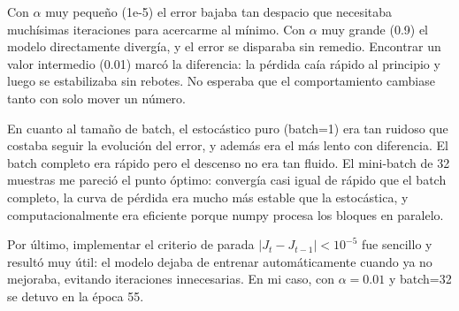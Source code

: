\documentclass[../../__memoria.tex]{subfiles}
\begin{document}
Con $\alpha$ muy pequeño (1e-5) el error bajaba tan despacio que necesitaba muchísimas iteraciones para acercarme al mínimo. Con $\alpha$ muy grande (0.9) el modelo directamente divergía, y el error se disparaba sin remedio. Encontrar un valor intermedio (0.01) marcó la diferencia: la pérdida caía rápido al principio y luego se estabilizaba sin rebotes. No esperaba que el comportamiento cambiase tanto con solo mover un número.

En cuanto al tamaño de batch, el estocástico puro (batch=1) era tan ruidoso que costaba seguir la evolución del error, y además era el más lento con diferencia. El batch completo era rápido pero el descenso no era tan fluido. El mini-batch de 32 muestras me pareció el punto óptimo: convergía casi igual de rápido que el batch completo, la curva de pérdida era mucho más estable que la estocástica, y computacionalmente era eficiente porque numpy procesa los bloques en paralelo.

Por último, implementar el criterio de parada $|J_t - J_{t-1}| < 10^{-5}$ fue sencillo y resultó muy útil: el modelo dejaba de entrenar automáticamente cuando ya no mejoraba, evitando iteraciones innecesarias. En mi caso, con $\alpha=0.01$ y batch=32 se detuvo en la época 55.

\vspace{3.0cm}
\end{document}
